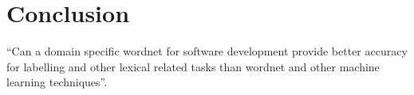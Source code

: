 \documentclass[10pt, conference, compsocconf]{IEEEtran}
\begin{document}

\section{Conclusion}
``Can a domain specific wordnet for
   software development provide better accuracy for labelling and other
   lexical related tasks than wordnet and other machine learning
   techniques''.




\end{document}
